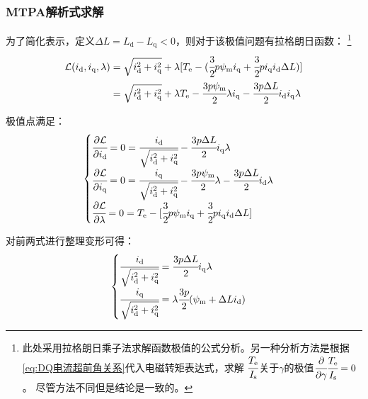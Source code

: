 \subsubsection{MTPA解析式求解}
为了简化表示，定义\(\Delta L=L_{\mathrm{d}}-L_{\mathrm{q}}<0\)，则对于该极值问题有拉格朗日函数：
\footnote{此处采用拉格朗日乘子法求解函数极值的公式分析。另一种分析方法是根据\eqref{eq:DQ电流超前角关系}代入电磁转矩表达式，求解
\(\cfrac{T_{\mathrm{e}}}{I_{\mathrm{s}}}\)关于\(\gamma\)的极值\(\cfrac{\partial}{\partial \gamma}\cfrac{T_{\mathrm{e}}}{I_{\mathrm{s}}}=0\)。
尽管方法不同但是结论是一致的。}
\begin{align*}
    \mathcal{L}(i_{\mathrm{d}},i_{\mathrm{q}},\lambda)&=\sqrt{i_{\mathrm{d}}^2+i_{\mathrm{q}}^2}+
    \lambda[T_{\mathrm{e}}-(\cfrac{3}{2}p\psi_{\mathrm{m}}i_{\mathrm{q}}+\cfrac{3}{2}pi_{\mathrm{q}}i_{\mathrm{d}}\Delta L)]\\
    &=\sqrt{i_{\mathrm{d}}^2+i_{\mathrm{q}}^2}+\lambda T_{\mathrm{e}}-\cfrac{3p\psi_{\mathrm{m}}}{2}\lambda i_{\mathrm{q}}-
    \cfrac{3p\Delta L}{2}i_{\mathrm{d}}i_{\mathrm{q}}\lambda
\end{align*}

极值点满足：
\begin{equation*}
    \begin{cases}
        \cfrac{\partial \mathcal{L}}{\partial i_{\mathrm{d}}}=0=\cfrac{i_{\mathrm{d}}}{\sqrt{i_{\mathrm{d}}^2+i_{\mathrm{q}}^2}}
        -\cfrac{3p\Delta L}{2}i_{\mathrm{q}}\lambda\\
        \cfrac{\partial \mathcal{L}}{\partial i_{\mathrm{q}}}=0=\cfrac{i_{\mathrm{q}}}{\sqrt{i_{\mathrm{d}}^2+i_{\mathrm{q}}^2}}
        -\cfrac{3p\psi_{\mathrm{m}}}{2}\lambda-\cfrac{3p\Delta L}{2}i_{\mathrm{d}}\lambda\\
        \cfrac{\partial \mathcal{L}}{\partial \lambda}=0=T_{\mathrm{e}}-[\cfrac{3}{2}p\psi_{\mathrm{m}}i_{\mathrm{q}}+
        \cfrac{3}{2}pi_{\mathrm{q}}i_{\mathrm{d}}\Delta L]
    \end{cases}
\end{equation*}

对前两式进行整理变形可得：
\begin{equation*}
    \begin{cases}
        \cfrac{i_{\mathrm{d}}}{\sqrt{i_{\mathrm{d}}^2+i_{\mathrm{q}}^2}}=\cfrac{3p\Delta L}{2}i_{\mathrm{q}}\lambda\\
        \cfrac{i_{\mathrm{q}}}{\sqrt{i_{\mathrm{d}}^2+i_{\mathrm{q}}^2}}=\lambda\cfrac{3p}{2}(\psi_{\mathrm{m}}+\Delta L i_{\mathrm{d}})
    \end{cases}
\end{equation*}

